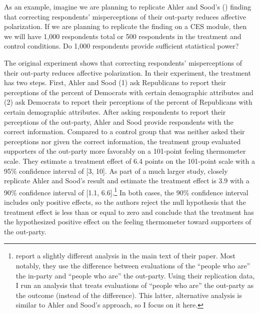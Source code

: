 \documentclass[12pt]{article}
\begin{document}
As an example, imagine we are planning to replicate Ahler and Sood's (\citeyear{Ahler2018}) finding that correcting respondents' misperceptions of their out-party reduces affective polarization.
If we are planning to replicate the finding on a CES module, then we will have 1,000 respondents total or 500 respondents in the treatment and control conditions. 
Do 1,000 respondents provide sufficient statistical power?

The original experiment shows that correcting respondents' misperceptions of their out-party reduces affective polarization. 
In their experiment, the treatment has two steps. 
First, Ahler and Sood (1) ask Republicans to report their perceptions of the percent of Democrats with certain demographic attributes and (2) ask Democrats to report their perceptions of the percent of Republicans with certain demographic attributes. 
After asking respondents to report their perceptions of the out-party, Ahler and Sood provide respondents with the correct information. 
Compared to a control group that was neither asked their perceptions nor given the correct information, the treatment group evaluated supporters of the out-party more favorably on a 101-point feeling thermometer scale. 
They estimate a treatment effect of 6.4 points on the 101-point scale with a 95\% confidence interval of [3, 10]. 
As part of a much larger study, \cite{Broockman2022} closely replicate Ahler and Sood's result and estimate the treatment effect is 3.9 with a 90\% confidence interval of [1.1, 6.6].\footnote{
  \cite{Broockman2022} report a slightly different analysis in the main text of their paper. 
  Most notably, they use the difference between evaluations of the ``people who are'' the in-party and ``people who are'' the out-party. 
  Using their replication data, I run an analysis that treats evaluations of ``people who are'' the out-party as the outcome (instead of the difference). 
  This latter, alternative analysis is similar to Ahler and Sood's approach, so I focus on it here.} 
In both cases, the 90\% confidence interval includes only positive effects, so the authors reject the null hypothesis that the treatment effect is less than or equal to zero and conclude that the treatment has the hypothesized positive effect on the feeling thermometer toward supporters of the out-party.
\end{document}
